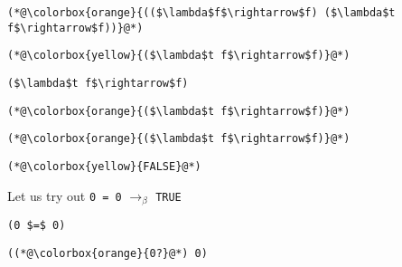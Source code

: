 \documentclass{beamer}
\begin{document}
\begin{frame}[fragile]{\CurrentSection}
\lstset{basicstyle=\ttfamily\small}\lstset{numbers=none}\lstset{language=ML}\begin{lstlisting}
(*@\colorbox{orange}{(($\lambda$f$\rightarrow$f) ($\lambda$t f$\rightarrow$f))}@*)
\end{lstlisting}
\pause\lstset{language=ML}\begin{lstlisting}
(*@\colorbox{yellow}{($\lambda$t f$\rightarrow$f)}@*)
\end{lstlisting}

\end{frame}

\begin{frame}[fragile]{\CurrentSection}
\lstset{basicstyle=\ttfamily\small}\lstset{numbers=none}\lstset{language=ML}\begin{lstlisting}
($\lambda$t f$\rightarrow$f)
\end{lstlisting}
\pause\lstset{language=ML}\begin{lstlisting}
(*@\colorbox{orange}{($\lambda$t f$\rightarrow$f)}@*)
\end{lstlisting}

\end{frame}

\begin{frame}[fragile]{\CurrentSection}
\lstset{basicstyle=\ttfamily\small}\lstset{numbers=none}\lstset{language=ML}\begin{lstlisting}
(*@\colorbox{orange}{($\lambda$t f$\rightarrow$f)}@*)
\end{lstlisting}
\pause\lstset{language=ML}\begin{lstlisting}
(*@\colorbox{yellow}{FALSE}@*)
\end{lstlisting}

\end{frame}

\begin{frame}[fragile]{\CurrentSection}
\begin{block}{\CurrentSubSection}
Let us try out \texttt{0 = 0} $\rightarrow_\beta$ \texttt{TRUE}
\end{block}


\end{frame}

\begin{frame}[fragile]{\CurrentSection}
\lstset{basicstyle=\ttfamily\small}\lstset{numbers=none}\lstset{language=ML}\begin{lstlisting}
(0 $=$ 0)
\end{lstlisting}
\pause\lstset{language=ML}\begin{lstlisting}
((*@\colorbox{orange}{0?}@*) 0)
\end{lstlisting}

\end{frame}
\end{document}
